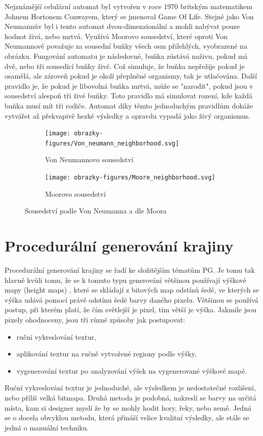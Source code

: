 Nejznámější celulární automat byl vytvořen v roce 1970 britským matematikem Johnem Hortonem Conwayem, který se jmenoval Game Of Life. Stejně jako Von Neumannův byl i tento automat dvou-dimenzionální a mohli nabývat pouze hodnot živá, nebo mrtvá. Využívá Moorovo sousedství, které oproti Von Neumannově považuje za sousední buňky všech osm přilehlých, vyobrazené na obrázku. Fungování automatu je následovné, buňka zůstává naživu, pokud má dvě, nebo tři sousedící buňky živé. Což simuluje, že buňka nepřežije pokud je osamělá, ale zároveň pokud je okolí přeplněné organismy, tak je utlačována. Další pravidlo je, že pokud je libovolná buňka mrtvá, může se "narodit", pokud jsou v sousedství alespoň tři živé buňky. Toto pravidlo má simulovat rození, kde každá buňka musí mít tři rodiče. Automat díky těmto jednoduchým pravidlům dokáže vytvářet až překvapivě hezké výsledky a opravdu vypadá jako živý organismus. \cite{Gong2017}

\begin{figure}[h]
	\centering
	\begin{subfigure}{0.475\textwidth}
		\centering
		\texttt{[image: obrazky-figures/Von\_neumann\_neighborhood.svg]}
		\caption{Von Neumannovo sousedství}
	\end{subfigure}
	\begin{subfigure}{0.475\textwidth}
		\centering
		\texttt{[image: obrazky-figures/Moore\_neighborhood.svg]}
		\caption{Moorovo sousedství}
	\end{subfigure}
	\caption{Sousedství podle Von Neumanna a dle Moora}
\end{figure}

\section{Procedurální generování krajiny}
\label{Krajina}
Procedurální generování krajiny se řadí ke složitějším tématům PG. Je tomu tak hlavně kvůli tomu, že se k tomuto typu generování většinou používají výškové mapy (height maps) , které se skládají z bitových map odstínů šedé, ve kterých se výška udává pomocí právě odstínu šedé barvy daného pixelu. Většinou se používá postup, při kterém platí, že čím světlejší je pixel, tím větší je výška. Jakmile jsou pixely ohodnoceny, jsou tři různé způsoby jak postupovat:
\begin{itemize}
	\item ruční vykreslování textur,
	\item aplikování textur na ručně vytvořené regiony podle výšky,
	\item vygenerování textur po analyzování výšek na vygenerované výškové mapě.
\end{itemize}
Ruční vykreslování textur je jednoduché, ale výsledkem je nedostatečné rozlišení, nebo příliš velká bitmapa. Druhá metoda je podobná, nakreslí se barvy na určitá místa, kam si designer myslí že by se mohly hodit hory, řeky, nebo země. Jedná se o docela obvyklou metodu, která přináší velice kvalitní výsledky, ale stále se jedná o manuální techniku.

